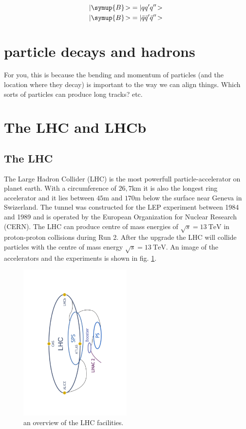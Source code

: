\begin{align}
	|\symup{B}\!> &= |q q' q''\!> \\
	|\symup{B}\!> &= |\bar{q} \bar{q}' \bar{q}''\!> \,
\end{align}

\section{particle decays and hadrons}
\label{sec:decays}
For you, this is because the bending and momentum of particles (and the location where they decay) is important to the way we can align things. Which sorts of particles can produce long tracks? etc.

\section{The LHC and LHCb}
\label{sec:lhcandB}

\subsection{The LHC}
The Large Hadron Collider (LHC)\cite{lhcInfo} is the most powerfull particle-accelerator on planet earth. With a circumference of $26,7\si{\kilo\metre}$ it is also the longest ring accelerator and it lies between $45\si{\metre}$ and $170\si{\metre}$ below the surface near Geneva in Swizerland. The tunnel was constructed for the LEP experiment between 1984 and 1989 and is operated by the European Organization for Nuclear Research (CERN). The LHC can produce centre of mass energies of $\sqrt{s} = \SI{13}{\tera\electronvolt}$ in proton-proton collisions during Run 2. After the upgrade the LHC will collide particles with the centre of mass energy $\sqrt{s} = \SI{13}{\tera\electronvolt}$.
An image of the accelerators and the experiments is shown in fig. \ref{fig:CERN}\cite{facilityCERN}.

\begin{figure}
  \centering
  \includegraphics[angle=-90, origin=c, width=0.5\textwidth]{plots/CERN_layout.pdf}
  \caption{an overview of the LHC facilities.}
  \label{fig:CERN}
\end{figure}

